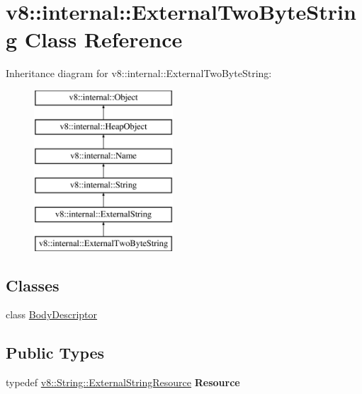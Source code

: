 \hypertarget{classv8_1_1internal_1_1_external_two_byte_string}{}\section{v8\+:\+:internal\+:\+:External\+Two\+Byte\+String Class Reference}
\label{classv8_1_1internal_1_1_external_two_byte_string}
Inheritance diagram for v8\+:\+:internal\+:\+:External\+Two\+Byte\+String\+:\begin{figure}[H]
\begin{center}
\leavevmode
\includegraphics[height=6.000000cm]{classv8_1_1internal_1_1_external_two_byte_string}
\end{center}
\end{figure}
\subsection*{Classes}
\begin{DoxyCompactItemize}
\item 
class \hyperlink{classv8_1_1internal_1_1_external_two_byte_string_1_1_body_descriptor}{Body\+Descriptor}
\end{DoxyCompactItemize}
\subsection*{Public Types}
\begin{DoxyCompactItemize}
\item 
typedef \hyperlink{classv8_1_1_string_1_1_external_string_resource}{v8\+::\+String\+::\+External\+String\+Resource} {\bfseries Resource}\hypertarget{classv8_1_1internal_1_1_external_two_byte_string_a5a74ee8539e114d51940dc69c742880b}{}\label{classv8_1_1internal_1_1_external_two_byte_string_a5a74ee8539e114d51940dc69c742880b}

\end{DoxyCompactItemize}
